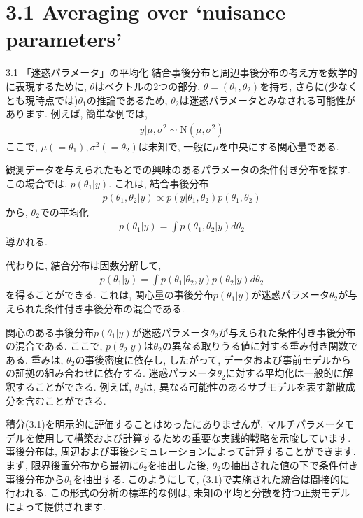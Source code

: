 \documentclass[10pt,dvipdfmx,a4]{beamer}
\newcommand{\eq}[1]{\begin{align}#1\end{align}}
\newcommand{\eqn}[1]{\begin{align*}#1\end{align*}}
\begin{document}
\section{3.1 Averaging over ‘nuisance parameters’}
\begin{frame}{3.1 「迷惑パラメータ」の平均化}
結合事後分布と周辺事後分布の考え方を数学的に表現するために, $\theta$はベクトルの2つの部分, $\theta=(\theta_1, \theta_2)$を持ち, さらに(少なくとも現時点では)$\theta_1$の推論であるため, $\theta_2$は迷惑パラメータとみなされる可能性があります.
例えば, 簡単な例では,
\eqn{y|\mu,\sigma^2 \sim \text{N}(\mu,\sigma^2)}
ここで, $\mu(=\theta_1), \sigma^2(=\theta_2)$は未知で, 一般に$\mu$を中央にする関心量である.

観測データを与えられたもとでの興味のあるパラメータの条件付き分布を探す.
この場合では, $p(\theta_1|y)$.
これは, 結合事後分布
\eqn{p(\theta_1,\theta_2|y)\propto p(y|\theta_1, \theta_2)p(\theta_1, \theta_2)}
から, $\theta_2$での平均化
\eqn{ p(\theta_1|y)=\int p(\theta_1,\theta_2|y)d\theta_2}
導かれる.
\end{frame}


\begin{frame}
代わりに, 結合分布は因数分解して,
\eq{p(\theta_1|y)=\int p(\theta_1|\theta_2, y)p(\theta_2|y)d\theta_2}
を得ることができる.
これは, 関心量の事後分布$p(\theta_1|y)$が迷惑パラメータ$\theta_2$が与えられた条件付き事後分布の混合である.

関心のある事後分布$p(\theta_1|y)$が迷惑パラメータ$\theta_2$が与えられた条件付き事後分布の混合である.
ここで, $p(\theta_2|y)$は$\theta_2$の異なる取りうる値に対する重み付き関数である.
重みは, $\theta_2$の事後密度に依存し, したがって, データおよび事前モデルからの証拠の組み合わせに依存する.
迷惑パラメータ$\theta_2$に対する平均化は一般的に解釈することができる.
例えば, $\theta_2$は, 異なる可能性のあるサブモデルを表す離散成分を含むことができる.

積分(3.1)を明示的に評価することはめったにありませんが, マルチパラメータモデルを使用して構築および計算するための重要な実践的戦略を示唆しています.
事後分布は, 周辺および事後シミュレーションによって計算することができます.
まず, 限界後置分布から最初に$\theta_2$を抽出した後, $\theta_2$の抽出された値の下で条件付き事後分布から$\theta_1$を抽出する.
このようにして, (3.1)で実施された統合は間接的に行われる.
この形式の分析の標準的な例は, 未知の平均と分散を持つ正規モデルによって提供されます.
\end{frame}
\end{document}
